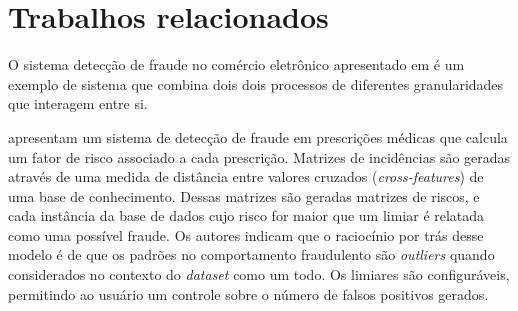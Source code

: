\section{Trabalhos relacionados}

O sistema detecção de fraude no comércio eletrônico apresentado em \citet{Huang2010} é um exemplo de sistema que combina dois dois processos de diferentes granularidades que interagem entre si.

\citet{Aral2011} apresentam um sistema de detecção de fraude em prescrições médicas que calcula um fator de risco associado a cada prescrição. Matrizes de incidências são geradas através de uma medida de distância entre valores cruzados (\emph{cross-features}) de uma base de conhecimento. Dessas matrizes são geradas matrizes de riscos, e cada instância da base de dados cujo risco for maior que um limiar é relatada como uma possível fraude. Os autores indicam que o raciocínio por trás desse modelo é de que os padrões no comportamento fraudulento são \emph{outliers} quando considerados no contexto do \emph{dataset} como um todo. Os limiares são configuráveis, permitindo ao usuário um controle sobre o número de falsos positivos gerados.
